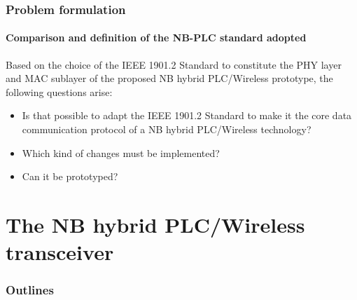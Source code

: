 \documentclass[mathserif]{beamer}
\newcommand{\wait}{\vfill}
\begin{document}
\begin{frame}
	\frametitle{Problem formulation}
	\framesubtitle{Comparison and definition of the NB-PLC standard adopted}
		Based on the choice of the IEEE 1901.2 Standard to constitute the  PHY layer and MAC sublayer of the proposed NB hybrid PLC/Wireless	prototype, the following questions arise:		
		\begin{itemize}
			\item Is that possible to adapt the IEEE 1901.2 Standard to make it the core data communication protocol of a NB hybrid PLC/Wireless technology? \wait
			\item Which kind of changes must be implemented? \wait
			\item Can it be prototyped?
		\end{itemize}		
\end{frame}

\section{The NB hybrid PLC/Wireless transceiver}
\begin{frame}
	\frametitle{Outlines}
	\small
	\tableofcontents[currentsection]
\end{frame}
\end{document}
